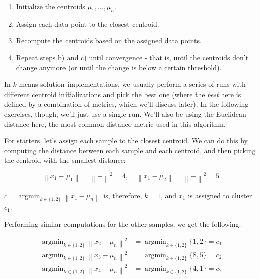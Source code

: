 \documentclass[12pt]{article}
\begin{document}
\begin{enumerate}[leftmargin=\labelsep]
  \begin{enumerate}
    \item Initialize the centroids $\mu_1, \ldots, \mu_n$.
    \item Assign each data point to the closest centroid.
    \item Recompute the centroids based on the assigned data points.
    \item Repeat steps b) and c) until convergence - that is, until the centroids don't change anymore
          (or until the change is below a certain threshold).
  \end{enumerate}

  In $k$-means solution implementations, we usually perform a series of runs with different
  centroid initializations and pick the best one (where the \textit{best} here
  is defined by a combination of metrics, which we'll discuss later). In the following
  exercises, though, we'll just use a single run. We'll also be using the Euclidean distance here,
  the most common distance metric used in this algorithm.

  For starters, let's assign each sample to the closest centroid. We can do this by computing
  the distance between each sample and each centroid, and then picking the centroid with the
  smallest distance:

  \begin{equation*}
    \left\| x_1 - \mu_1 \right\| = \left\|  -  \right\|^2 = 4, \quad
    \left\| x_1 - \mu_2 \right\| = \left\|  -  \right\|^2 = 5
  \end{equation*}

  $c = \operatorname{argmin}_{k \in \{1, 2\}} \left\| x_1 - \mu_n \right\|$ is, therefore, $k = 1$,
  and $x_1$ is assigned to cluster $c_1$.

  Performing similar computations for the other samples, we get the following:

  \begin{equation*}
    \begin{aligned}
      \operatorname{argmin}_{k \in \{1, 2\}} \left\| x_2 - \mu_n \right\|^2 & = \operatorname{argmin}_{k \in \{1, 2\}} \{1, 2\} = c_1 \\
      \operatorname{argmin}_{k \in \{1, 2\}} \left\| x_3 - \mu_n \right\|^2 & = \operatorname{argmin}_{k \in \{1, 2\}} \{8, 5\} = c_2 \\
      \operatorname{argmin}_{k \in \{1, 2\}} \left\| x_4 - \mu_n \right\|^2 & = \operatorname{argmin}_{k \in \{1, 2\}} \{4, 1\} = c_2
    \end{aligned}
  \end{equation*}


\end{enumerate}
\end{document}
